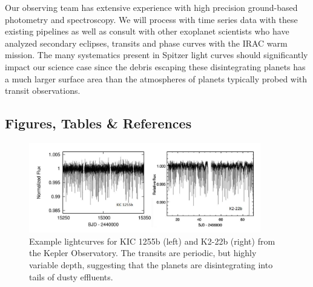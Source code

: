 \documentclass[letterpaper,12pt]{article}
\begin{document}
%
%
%
Our observing team has extensive experience with high precision ground-based photometry and spectroscopy. 
We will process with time series data with these existing pipelines as well as consult with other exoplanet scientists who have analyzed secondary eclipses, transits and phase curves with the IRAC warm mission.
The many systematics present in Spitzer light curves should significantly impact our science case since the debris escaping these disintegrating planets has a much larger surface area than the atmospheres of planets typically probed with transit observations.
%

\clearpage
\subsection{Figures, Tables \& References}

\begin{figure}
\centering
\includegraphics[width=0.9\textwidth]{kepler_lightc_variable.png}
\caption{Example lightcurves for KIC 1255b (left) and K2-22b (right) from the Kepler Observatory. The transits are periodic, but highly variable depth, suggesting that the planets are disintegrating into tails of dusty effluents.}\label{fig:exKeplerCurves}
\end{figure}
\end{document}
